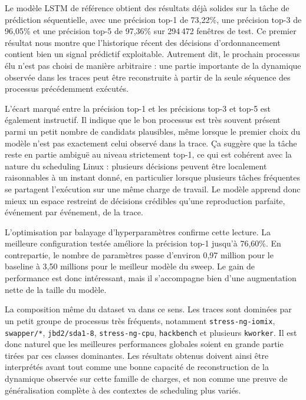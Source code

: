 \documentclass[letterpaper, 10 pt, conference]{ieeeconf}  %
\begin{document}
Le modèle LSTM de référence obtient des résultats déjà solides sur la tâche de prédiction séquentielle, avec une précision top-1 de 73,22\%, une précision top-3 de 96,05\% et une précision top-5 de 97,36\% sur 294\,472 fenêtres de test. Ce premier résultat nous montre que l'historique récent des décisions d'ordonnancement contient bien un signal prédictif exploitable. Autrement dit, le prochain processus élu n'est pas choisi de manière arbitraire : une partie importante de la dynamique observée dans les traces peut être reconstruite à partir de la seule séquence des processus précédemment exécutés.

L'écart marqué entre la précision top-1 et les précisions top-3 et top-5 est également instructif. Il indique que le bon processus est très souvent présent parmi un petit nombre de candidats plausibles, même lorsque le premier choix du modèle n'est pas exactement celui observé dans la trace. Ça suggère que la tâche reste en partie ambiguë au niveau strictement top-1, ce qui est cohérent avec la nature du scheduling Linux : plusieurs décisions peuvent être localement raisonnables à un instant donné, en particulier lorsque plusieurs tâches fréquentes se partagent l'exécution sur une même charge de travail. Le modèle apprend donc mieux un espace restreint de décisions crédibles qu'une reproduction parfaite, événement par événement, de la trace.

L'optimisation par balayage d'hyperparamètres confirme cette lecture. La meilleure configuration testée améliore la précision top-1 jusqu'à 76,60\%. En contrepartie, le nombre de paramètres passe d'environ 0,97 million pour le baseline à 3,50 millions pour le meilleur modèle du sweep. Le gain de performance est donc intéressant, mais il s'accompagne bien d'une augmentation nette de la taille du modèle. 

La composition même du dataset va dans ce sens. Les traces sont dominées par un petit groupe de processus très fréquents, notamment \texttt{stress-ng-iomix}, \texttt{swapper/*}, \texttt{jbd2/sda1-8}, \texttt{stress-ng-cpu}, \texttt{hackbench} et plusieurs \texttt{kworker}. Il est donc naturel que les meilleures performances globales soient en grande partie tirées par ces classes dominantes. Les résultats obtenus doivent ainsi être interprétés avant tout comme une bonne capacité de reconstruction de la dynamique observée sur cette famille de charges, et non comme une preuve de généralisation complète à des contextes de scheduling plus variés.
\end{document}
